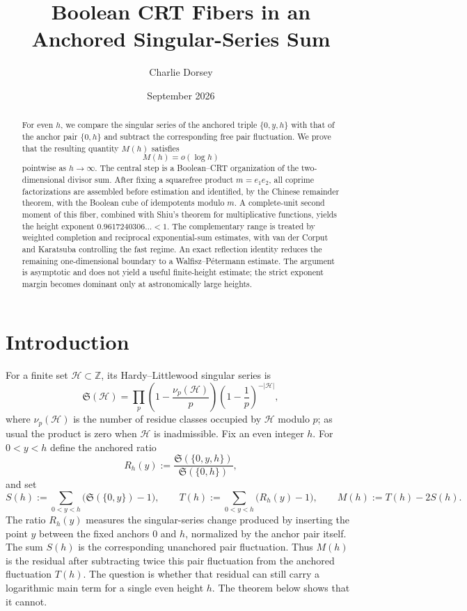 \documentclass[11pt]{article}
\title{Boolean CRT Fibers in an Anchored Singular-Series Sum}
\author{Charlie Dorsey}
\date{September 2026}
\theoremstyle{definition}
\theoremstyle{remark}
\newcommand{\SSer}{\mathfrak S}
\newcommand{\1}{\mathbf 1}
\begin{document}
\maketitle

\begin{abstract}
For even $h$, we compare the singular series of the anchored triple $\{0,y,h\}$ with that of the anchor pair $\{0,h\}$ and subtract the corresponding free pair fluctuation.  We prove that the resulting quantity $M(h)$ satisfies
\[
M(h)=o(\log h)
\]
pointwise as $h\to\infty$.  The central step is a Boolean--CRT organization of the two-dimensional divisor sum.  After fixing a squarefree product $m=e_1e_2$, all coprime factorizations are assembled before estimation and identified, by the Chinese remainder theorem, with the Boolean cube of idempotents modulo $m$.  A complete-unit second moment of this fiber, combined with Shiu's theorem for multiplicative functions, yields the height exponent $0.9617240306\ldots<1$.  The complementary range is treated by weighted completion and reciprocal exponential-sum estimates, with van der Corput and Karatsuba controlling the fast regime.  An exact reflection identity reduces the remaining one-dimensional boundary to a Walfisz--P\'etermann estimate.  The argument is asymptotic and does not yield a useful finite-height estimate; the strict exponent margin becomes dominant only at astronomically large heights.
\end{abstract}

\section{Introduction}\label{sec:introduction}

For a finite set $\mathcal H\subset\mathbb Z$, its Hardy--Littlewood singular series is
\[
\SSer(\mathcal H)
 =\prod_p\left(1-\frac{\nu_p(\mathcal H)}p\right)
       \left(1-\frac1p\right)^{-|\mathcal H|},
\]
where $\nu_p(\mathcal H)$ is the number of residue classes occupied by $\mathcal H$ modulo $p$; as usual the product is zero when $\mathcal H$ is inadmissible.  Fix an even integer $h$.  For $0<y<h$ define the anchored ratio
\begin{equation}\label{eq:R-def}
R_h(y):=\frac{\SSer(\{0,y,h\})}{\SSer(\{0,h\})},
\end{equation}
and set
\begin{equation}\label{eq:S-M-def}
S(h):=\sum_{0<y<h}\bigl(\SSer(\{0,y\})-1\bigr),
\qquad
T(h):=\sum_{0<y<h}\bigl(R_h(y)-1\bigr),
\qquad
M(h):=T(h)-2S(h).
\end{equation}
The ratio $R_h(y)$ measures the singular-series change produced by inserting the point $y$ between the fixed anchors $0$ and $h$, normalized by the anchor pair itself.  The sum $S(h)$ is the corresponding unanchored pair fluctuation.  Thus $M(h)$ is the residual after subtracting twice this pair fluctuation from the anchored fluctuation $T(h)$.  The question is whether that residual can still carry a logarithmic main term for a single even height $h$.  The theorem below shows that it cannot.
\end{document}
